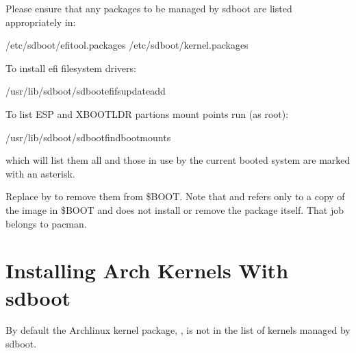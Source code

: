 \documentclass[letterpaper,11pt,english]{sphinxmanual}
\begin{document}
\sphinxAtStartPar
Please ensure that any packages to be managed by sd\sphinxhyphen{}boot are listed appropriately in:

\begin{sphinxVerbatim}[commandchars=\\\{\}]
/etc/sd\PYGZhy{}boot/efi\PYGZhy{}tool.packages
/etc/sd\PYGZhy{}boot/kernel.packages
\end{sphinxVerbatim}

\sphinxAtStartPar
To install efi filesystem drivers:

\begin{sphinxVerbatim}[commandchars=\\\{\}]
/usr/lib/sd\PYGZhy{}boot/sd\PYGZhy{}boot\PYGZhy{}efifs\PYGZhy{}updateadd
\end{sphinxVerbatim}

\sphinxAtStartPar
To list ESP and XBOOTLDR partions mount points run (as root):

\begin{sphinxVerbatim}[commandchars=\\\{\}]
/usr/lib/sd\PYGZhy{}boot/sd\PYGZhy{}boot\PYGZhy{}find\PYGZhy{}boot\PYGZhy{}mounts
\end{sphinxVerbatim}

\sphinxAtStartPar
which will list them all and those in use by the current booted system are marked
with an asterisk.

\sphinxAtStartPar
Replace  by  to remove them from \$BOOT. Note that  and  refers
only to a copy of the image in \$BOOT and does not install or remove the package itself.
That job belongs to pacman.

\sphinxstepscope


\chapter{Installing Arch Kernels With sd\sphinxhyphen{}boot}
\label{\detokenize{Arch-Kernels:installing-arch-kernels-with-sd-boot}}\label{\detokenize{Arch-Kernels:arch-kernels}}\label{\detokenize{Arch-Kernels::doc}}
\sphinxAtStartPar
By default the Archlinux kernel package, , is not in the list of kernels managed by sd\sphinxhyphen{}boot.
\end{document}
